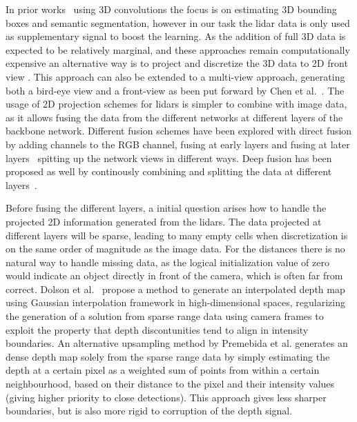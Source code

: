 In prior works~\cite{engelcke2017,zhou2017voxelnet,wang2015} using 3D convolutions the focus is on estimating 3D bounding boxes and semantic segmentation, however in our task the lidar data is only used as supplementary signal to boost the learning. As the addition of full 3D data is expected to be relatively marginal, and these approaches remain computationally expensive\needref\cite{chen2017} an alternative way is to project and discretize the 3D data to 2D front view \cite{li2016}. This approach can also be extended to a multi-view approach, generating both a bird-eye view and a front-view as been put forward by Chen et al.~\cite{chen2017}. The usage of 2D projection schemes for lidars is simpler to combine with image data, as it allows fusing the data from the different networks at different layers of the backbone network. Different fusion schemes have been explored with direct fusion by adding channels to the RGB channel, fusing at early layers and fusing at later layers~\cite{schlosser2016} spitting up the network views in different ways. Deep fusion has been proposed as well by continously combining and splitting the data at different layers~\cite{chen2017}.  

Before fusing the different layers, a initial question arises how to handle the projected 2D information generated from the lidars. The data projected at different layers will be sparse, leading to many empty cells when discretization is on the same order of magnitude as the image data. For the distances there is no natural way to handle missing data, as the logical initialization value of zero would indicate an object directly in front of the camera, which is often far from correct. Dolson et al.~\cite{dolson2010} propose a method to generate an interpolated depth map using Gaussian interpolation framework in high-dimensional spaces, regularizing the generation of a solution from sparse range data using camera frames to exploit the property that depth discontunities tend to align in intensity boundaries. An alternative upsampling method by Premebida et al.\cite{premebida2014} generates an dense depth map solely from the sparse range data by simply estimating the depth at a certain pixel as a weighted sum of points from within a certain neighbourhood, based on their distance to the pixel and their intensity values (giving higher priority to close detections). This approach gives less sharper boundaries, but is also more rigid to corruption of the depth signal.  

